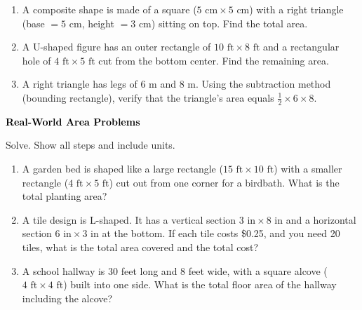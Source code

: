 \documentclass[12pt, letterpaper, fleqn]{article}
\begin{document}
\begin{enumerate}[itemsep=3cm, leftmargin=0.6cm]

\item A composite shape is made of a square ($5\text{ cm} \times 5\text{ cm}$) with a right triangle (base $= 5\text{ cm}$, height $= 3\text{ cm}$) sitting on top. Find the total area.

\vspace{2.2cm}

\item A U-shaped figure has an outer rectangle of $10\text{ ft} \times 8\text{ ft}$ and a rectangular hole of $4\text{ ft} \times 5\text{ ft}$ cut from the bottom center. Find the remaining area.

\vspace{2.2cm}

\item A right triangle has legs of 6 m and 8 m. Using the subtraction method (bounding rectangle), verify that the triangle's area equals $\frac{1}{2} \times 6 \times 8$.

\vspace{2.5cm}

\end{enumerate}

\newpage

\begin{tcolorbox}[colback=black!10]
\large\textcolor{black}{\textbf{Real-World Area Problems}}
\end{tcolorbox}

\noindent
Solve. Show all steps and include units.

\vspace{3mm}

\begin{enumerate}[itemsep=2.4cm, leftmargin=0.6cm]

\item A garden bed is shaped like a large rectangle ($15\text{ ft} \times 10\text{ ft}$) with a smaller rectangle ($4\text{ ft} \times 5\text{ ft}$) cut out from one corner for a birdbath. What is the total planting area?

\vspace{2.3cm}

\item A tile design is L-shaped. It has a vertical section $3\text{ in} \times 8\text{ in}$ and a horizontal section $6\text{ in} \times 3\text{ in}$ at the bottom. If each tile costs \$0.25, and you need 20 tiles, what is the total area covered and the total cost?

\vspace{2.3cm}

\item A school hallway is 30 feet long and 8 feet wide, with a square alcove ($4\text{ ft} \times 4\text{ ft}$) built into one side. What is the total floor area of the hallway including the alcove?

\vspace{2.5cm}

\end{enumerate}
\end{document}
